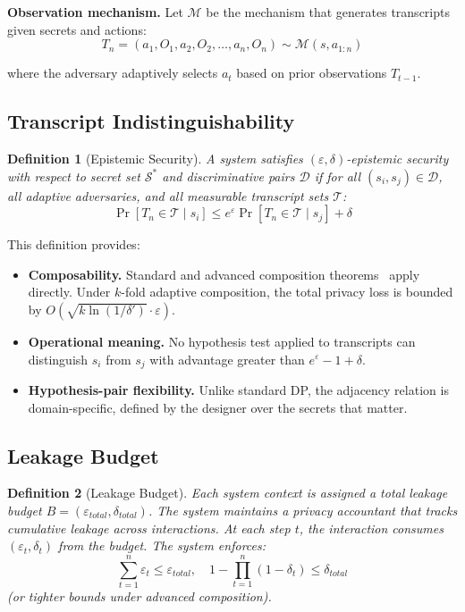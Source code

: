\documentclass[11pt,a4paper]{article}
\newtheorem{definition}{Definition}[section]
\begin{document}
\textbf{Observation mechanism.} Let $\mathcal{M}$ be the mechanism that generates transcripts given secrets and actions:
\begin{equation}
T_n = (a_1, O_1, a_2, O_2, \ldots, a_n, O_n) \sim \mathcal{M}(s, a_{1:n})
\end{equation}

where the adversary adaptively selects $a_t$ based on prior observations $T_{t-1}$.

\subsection{Transcript Indistinguishability}

\begin{definition}[Epistemic Security]\label{def:epistemic-security}
A system satisfies $(\varepsilon, \delta)$-epistemic security with respect to secret set $\mathcal{S}^*$ and discriminative pairs $\mathcal{D}$ if for all $(s_i, s_j) \in \mathcal{D}$, all adaptive adversaries, and all measurable transcript sets $\mathcal{T}$:
\begin{equation}\label{eq:indist}
\Pr[T_n \in \mathcal{T} \mid s_i] \le e^{\varepsilon} \Pr[T_n \in \mathcal{T} \mid s_j] + \delta
\end{equation}
\end{definition}

This definition provides:
\begin{itemize}
  \item \textbf{Composability.} Standard and advanced composition theorems~\cite{dwork2010boosting} apply directly. Under $k$-fold adaptive composition, the total privacy loss is bounded by $O(\sqrt{k \ln(1/\delta')} \cdot \varepsilon)$.
  \item \textbf{Operational meaning.} No hypothesis test applied to transcripts can distinguish $s_i$ from $s_j$ with advantage greater than $e^\varepsilon - 1 + \delta$.
  \item \textbf{Hypothesis-pair flexibility.} Unlike standard DP, the adjacency relation is domain-specific, defined by the designer over the secrets that matter.
\end{itemize}

\subsection{Leakage Budget}

\begin{definition}[Leakage Budget]\label{def:budget}
Each system context is assigned a total leakage budget $B = (\varepsilon_{total}, \delta_{total})$. The system maintains a privacy accountant that tracks cumulative leakage across interactions. At each step $t$, the interaction consumes $(\varepsilon_t, \delta_t)$ from the budget. The system enforces:
\begin{equation}\label{eq:budget}
\sum_{t=1}^{n} \varepsilon_t \le \varepsilon_{total}, \quad 1 - \prod_{t=1}^{n}(1 - \delta_t) \le \delta_{total}
\end{equation}
(or tighter bounds under advanced composition).
\end{definition}
\end{document}

